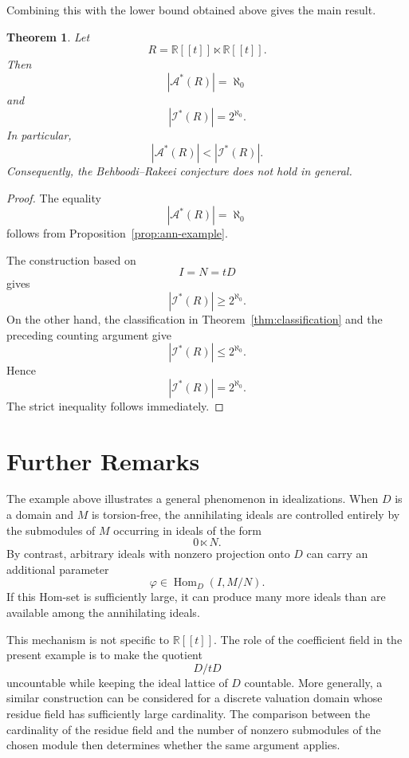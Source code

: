 \documentclass[11pt]{article}
\newtheorem{theorem}{Theorem}[section]
\theoremstyle{definition}
\theoremstyle{remark}
\newcommand{\Hom}{\operatorname{Hom}}
\newcommand{\lt}{\ltimes}
\begin{document}
	Combining this with the lower bound obtained above gives the main
	result.
	
	\begin{theorem}
		\label{thm:main}
		Let
		\[
		R=\mathbb R[[t]]\lt\mathbb R[[t]].
		\]
		Then
		\[
		|\mathcal A^*(R)|=\aleph_0
		\]
		and
		\[
		|\mathcal I^*(R)|=2^{\aleph_0}.
		\]
		In particular,
		\[
		|\mathcal A^*(R)|
		<
		|\mathcal I^*(R)|.
		\]
		Consequently, the Behboodi--Rakeei conjecture does not hold in
		general.
	\end{theorem}
	
	\begin{proof}
		The equality
		\[
		|\mathcal A^*(R)|=\aleph_0
		\]
		follows from Proposition~\ref{prop:ann-example}.
		
		The construction based on
		\[
		I=N=tD
		\]
		gives
		\[
		|\mathcal I^*(R)|\geq2^{\aleph_0}.
		\]
		On the other hand, the classification in
		Theorem~\ref{thm:classification} and the preceding counting argument
		give
		\[
		|\mathcal I^*(R)|\leq2^{\aleph_0}.
		\]
		Hence
		\[
		|\mathcal I^*(R)|=2^{\aleph_0}.
		\]
		The strict inequality follows immediately.
	\end{proof}
	
	
	\section{Further Remarks}
	
	The example above illustrates a general phenomenon in idealizations.
	When $D$ is a domain and $M$ is torsion-free, the annihilating ideals
	are controlled entirely by the submodules of $M$ occurring in ideals
	of the form
	\[
	0\ltimes N.
	\]
	By contrast, arbitrary ideals with nonzero projection onto $D$ can
	carry an additional parameter
	\[
	\varphi\in\Hom_D(I,M/N).
	\]
	If this Hom-set is sufficiently large, it can produce many more
	ideals than are available among the annihilating ideals.
	
	This mechanism is not specific to $\mathbb R[[t]]$. The role of the
	coefficient field in the present example is to make the quotient
	\[
	D/tD
	\]
	uncountable while keeping the ideal lattice of $D$ countable. More
	generally, a similar construction can be considered for a discrete
	valuation domain whose residue field has sufficiently large
	cardinality. The comparison between the cardinality of the residue
	field and the number of nonzero submodules of the chosen module then
	determines whether the same argument applies.
	
\end{document}
